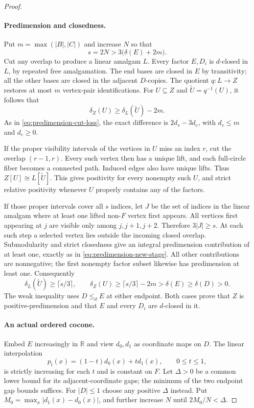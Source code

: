 \begin{proof}
\paragraph{Predimension and closedness.}
Put $m=\max(|B|,|C|)$ and increase $N$ so that
\[
 s=2N>3\bigl(\delta(E)+2m\bigr).
 \tag{AB}\label{eq:predimension-alternating-bound}
\]
Cut any overlap to produce a linear amalgam $L$. Every factor
$E,D_i$ is $d$-closed in $L$, by repeated free amalgamation.
The end bases are closed in $E$ by transitivity; all the other
bases are closed in the adjacent $D$-copies. The quotient
$q:L\to Z$ restores at most $m$ vertex-pair identifications.
For $U\subseteq Z$ and $\widetilde U=q^{-1}(U)$, it follows that
\[
 \delta_Z(U)\geq\delta_L(\widetilde U)-2m.
 \tag{3}\label{eq:predimension-alternating-loss}
\]
As in \eqref{eq:predimension-cut-loss}, the exact difference is
$2d_v-3d_e$, with $d_v\leq m$ and $d_e\geq0$.

If the proper visibility intervals of the vertices in $U$ miss
an index $r$, cut the overlap $(r-1,r)$. Every such vertex then
has a unique lift, and each full-circle fiber becomes a connected
path. Induced edges also have unique lifts. Thus
$Z[U]\cong L[\widetilde U]$. This gives positivity for every
nonempty such $U$, and strict relative positivity whenever $U$
properly contains any of the factors.

If those proper intervals cover all $s$ indices, let $J$ be the
set of indices in the linear amalgam where at least one lifted
non-$F$ vertex first appears. All vertices first appearing at $j$
are visible only among $j,j+1,j+2$. Therefore $3|J|\geq s$.
At each such step a selected vertex lies outside the incoming
closed overlap. Submodularity and strict closedness give an
integral predimension contribution of at least one, exactly as in
\eqref{eq:predimension-new-stage}. All other contributions are
nonnegative; the first nonempty factor subset likewise has
predimension at least one. Consequently
\[
 \delta_L(\widetilde U)\geq\lceil s/3\rceil,
 \qquad
 \delta_Z(U)\geq\lceil s/3\rceil-2m>\delta(E)\geq\delta(D)>0.
\]
The weak inequality uses $D\leq_d E$ at either endpoint.
Both cases prove that $Z$ is positive-predimension and that
$E$ and every $D_i$ are $d$-closed in it.

\paragraph{An actual ordered cocone.}
Embed $E$ increasingly in $\mathbb R$ and view $d_0,d_1$ as
coordinate maps on $D$. The linear interpolation
\[
 p_t(x)=(1-t)d_0(x)+td_1(x),\qquad 0\leq t\leq1,
\]
is strictly increasing for each $t$ and is constant on $F$.
Let $\Delta>0$ be a common lower bound for its adjacent-coordinate
gaps; the minimum of the two endpoint gap bounds suffices.
For $|D|\leq1$ choose any positive $\Delta$ instead. Put
$M_0=\max_x|d_1(x)-d_0(x)|$, and further increase $N$ until
$2M_0/N<\Delta$.


\end{proof}
